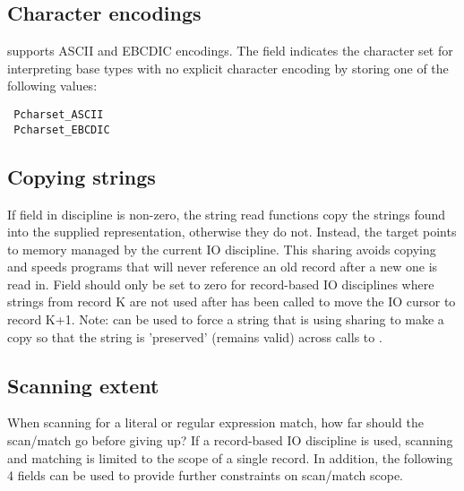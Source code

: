 \subsection{Character encodings}
\label{sec:library-customization-character-encodings}
\pads{} supports ASCII and EBCDIC encodings.
The  field indicates the character set for
interpreting base types with no explicit character encoding by storing
one of the following values:
\begin{verbatim}
 Pcharset_ASCII
 Pcharset_EBCDIC
\end{verbatim}


\subsection{Copying strings} 
\label{sec:library-customization-copy-strings}
 If  field in \pads{} discipline is non-zero, the string read functions
 copy the strings found into the supplied representation, otherwise they do not.
 Instead, the target  points to memory managed by the current
 IO discipline.  This sharing avoids copying and speeds programs that
 will never reference an old record after a new one is read in.
Field  should only be set to zero for record-based IO disciplines where
strings from record K are not used after  has been called to move
the IO cursor to record K+1.  Note:  can be used to
force a string that is using sharing to make a copy so that the string is 'preserved'
(remains valid) across calls to .

\subsection{Scanning extent}
\label{sec:library-customization-scanning-extent}
When scanning for a literal or regular expression match, how far
should the scan/match go before giving up?    If a record-based IO discipline is
used, scanning and matching is limited to the scope of a single record.  In
addition, the following 4  fields can be used to provide further
constraints on scan/match scope.  

